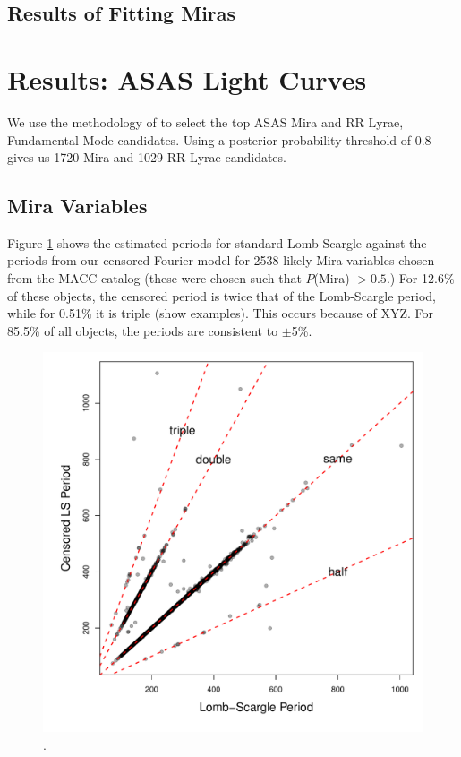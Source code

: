 \documentclass[12pt,preprint]{aastex}
\begin{document}
\subsection{Results of Fitting Miras}


\section{Results: ASAS Light Curves}
\label{sec:results}

We use the methodology of \cite{2011arXiv1106.2832R} to select the top ASAS Mira  and RR Lyrae, Fundamental Mode candidates.  Using a posterior probability threshold of 0.8 gives us 1720 Mira  and 1029 RR Lyrae candidates.

 \subsection{Mira Variables}

Figure \ref{fig:miraP} shows the estimated periods for standard Lomb-Scargle against the periods from our censored Fourier model for 2538 likely Mira variables chosen from the MACC catalog (these were chosen such that $P$(Mira) $>0.5$.)  For 12.6\% of these objects, the censored period is twice that of the Lomb-Scargle period, while for 0.51\% it is triple (show examples).  This occurs because of XYZ.  For 85.5\% of all objects, the periods are consistent to $\pm$5\%.


\begin{figure}
\begin{center}
\includegraphics[angle=0,width=6.5in]{../plots/mira_periods_LS_vs_Censored.pdf}
\end{center}
\caption{ .  \label{fig:miraP}}
\end{figure}
\end{document}
